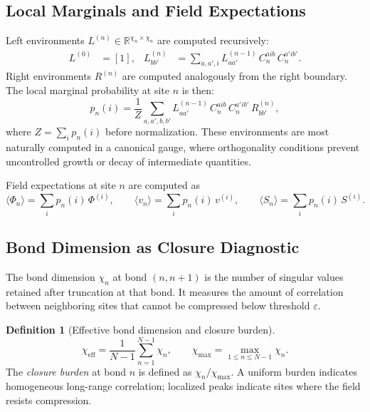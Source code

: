 \documentclass[11pt]{article}
\theoremstyle{definition}
\newtheorem{definition}[theorem]{Definition}
\begin{document}
\subsection{Local Marginals and Field Expectations}

Left environments $L^{(n)} \in \mathbb{R}^{\chi_n \times \chi_n}$ are
computed recursively:
\begin{align}
  L^{(0)} &= [1], &
  L^{(n)}_{bb'} &= \sum_{a,a',i} L^{(n-1)}_{aa'}\,
    C_n^{a i b}\,C_n^{a' i b'}.
  \label{eq:left_env}
\end{align}
Right environments $R^{(n)}$ are computed analogously from the right boundary.
The local marginal probability at site $n$ is then:
\begin{equation}
  p_n(i)
  = \frac{1}{Z}
    \sum_{a,a',b,b'}
    L^{(n-1)}_{aa'}\,C_n^{a i b}\,C_n^{a' i b'}\,R^{(n)}_{bb'},
  \label{eq:marginal}
\end{equation}
where $Z = \sum_i p_n(i)$ before normalization. These environments are most
naturally computed in a canonical gauge, where orthogonality conditions prevent
uncontrolled growth or decay of intermediate quantities.

Field expectations at site $n$ are computed as
\begin{equation}
  \langle \Phi_n \rangle = \sum_i p_n(i)\,\Phi^{(i)},
  \qquad
  \langle v_n \rangle = \sum_i p_n(i)\,v^{(i)},
  \qquad
  \langle S_n \rangle = \sum_i p_n(i)\,S^{(i)}.
  \label{eq:expectations}
\end{equation}

\subsection{Bond Dimension as Closure Diagnostic}

The bond dimension $\chi_n$ at bond $(n,n+1)$ is the number of singular values
retained after truncation at that bond. It measures the amount of correlation
between neighboring sites that cannot be compressed below threshold
$\varepsilon$.

\begin{definition}[Effective bond dimension and closure burden]
  \begin{equation}
    \chi_{\mathrm{eff}}
    = \frac{1}{N-1}\sum_{n=1}^{N-1}\chi_n,
    \qquad
    \chi_{\max} = \max_{1\le n\le N-1}\chi_n.
    \label{eq:chi_eff}
  \end{equation}
  The \emph{closure burden} at bond $n$ is defined as $\chi_n / \chi_{\max}$.
  A uniform burden indicates homogeneous long-range correlation; localized
  peaks indicate sites where the field resists compression.
\end{definition}
\end{document}
